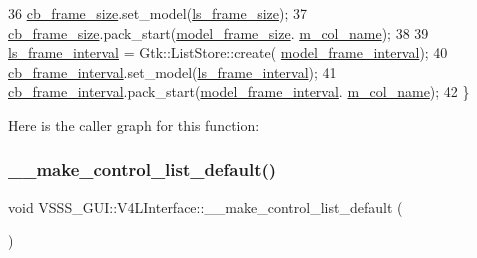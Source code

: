 \begin{DoxyCode}
36         \hyperlink{class_v_s_s_s___g_u_i_1_1_v4_l_interface_ad6dd4704d3b7d1f262843dd148269b73}{cb\_frame\_size}.set\_model(\hyperlink{class_v_s_s_s___g_u_i_1_1_v4_l_interface_ac3e4431f229b53c83e35f5f400f4afee}{ls\_frame\_size});
37         \hyperlink{class_v_s_s_s___g_u_i_1_1_v4_l_interface_ad6dd4704d3b7d1f262843dd148269b73}{cb\_frame\_size}.pack\_start(\hyperlink{class_v_s_s_s___g_u_i_1_1_v4_l_interface_a04efec56b83f5abf62316fd79ee5ef22}{model\_frame\_size}.
      \hyperlink{class_v_s_s_s___g_u_i_1_1_v4_l_interface_1_1_model_column_a96d5f652d19a139a1380d9ffc0110ed0}{m\_col\_name});
38 
39         \hyperlink{class_v_s_s_s___g_u_i_1_1_v4_l_interface_a91944c46bd07555790f773506a4bcf4c}{ls\_frame\_interval} = Gtk::ListStore::create(
      \hyperlink{class_v_s_s_s___g_u_i_1_1_v4_l_interface_ae6a12566332a48cf41aa8d4bbea6671e}{model\_frame\_interval});
40         \hyperlink{class_v_s_s_s___g_u_i_1_1_v4_l_interface_ad07b3bbad672e676e128f19a12f07e73}{cb\_frame\_interval}.set\_model(\hyperlink{class_v_s_s_s___g_u_i_1_1_v4_l_interface_a91944c46bd07555790f773506a4bcf4c}{ls\_frame\_interval});
41         \hyperlink{class_v_s_s_s___g_u_i_1_1_v4_l_interface_ad07b3bbad672e676e128f19a12f07e73}{cb\_frame\_interval}.pack\_start(\hyperlink{class_v_s_s_s___g_u_i_1_1_v4_l_interface_ae6a12566332a48cf41aa8d4bbea6671e}{model\_frame\_interval}.
      \hyperlink{class_v_s_s_s___g_u_i_1_1_v4_l_interface_1_1_model_column_a96d5f652d19a139a1380d9ffc0110ed0}{m\_col\_name});
42     \}
\end{DoxyCode}
Here is the caller graph for this function\+:
\mbox{\label{class_v_s_s_s___g_u_i_1_1_v4_l_interface_af0b71067889b902882e4f181b0a04aed}} 
\subsubsection{\texorpdfstring{\+\_\+\+\_\+make\+\_\+control\+\_\+list\+\_\+default()}{\_\_make\_control\_list\_default()}}
{\footnotesize\ttfamily void V\+S\+S\+S\+\_\+\+G\+U\+I\+::\+V4\+L\+Interface\+::\+\_\+\+\_\+make\+\_\+control\+\_\+list\+\_\+default (\begin{DoxyParamCaption}{ }\end{DoxyParamCaption})\hspace{0.3cm}{\ttfamily [private]}}



